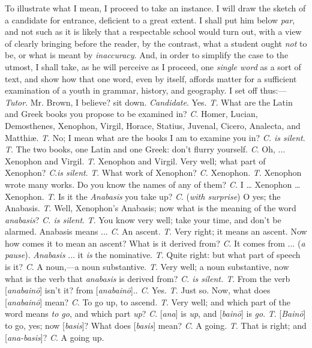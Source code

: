 To illustrate what I mean, I proceed to take an instance. I will
draw the sketch of a candidate for entrance, deficient to a great
extent. I shall put him below \emph{par}, and not such as it is likely that a
respectable school would turn out, with a view of clearly bringing
before the reader, by the contrast, what a student ought \emph{not} to
be, or what is meant by \emph{inaccuracy}. And, in order to simplify
the case to the utmost, I shall take, as he will perceive as I
proceed, one \emph{single word} as a sort of text, and show how that
one word, even by itself, affords matter for a sufficient examination
of a youth in grammar, history, and geography. I set off thus:—
\emph{Tutor}. Mr. Brown, I believe? sit down. \emph{Candidate}. Yes.
\emph{T.} What are the Latin and Greek books you propose to be
examined in? \emph{C}. Homer, Lucian, Demosthenes, Xenophon, Virgil,
Horace, Statius, Juvenal, Cicero, Analecta, and Matthiæ.
\emph{T}. No; I mean what are the books I am to examine you in? \emph{C.
is silent}.
\emph{T}. The two books, one Latin and one Greek: don't flurry
yourself. \emph{C}. Oh, ... Xenophon and Virgil.
\emph{T}. Xenophon and Virgil. Very well; what part of Xenophon? \emph{C}.\emph{is silent}.
\emph{T}. What work of Xenophon? \emph{C.} Xenophon.
\emph{T}. Xenophon wrote many works. Do you know the names of
any of them? \emph{C.} I … Xenophon … Xenophon.
\emph{T}. Is it the \emph{Anabasis} you take up? \emph{C}. (\emph{with
surprise}) O yes; the Anabasis.
\emph{T}. Well, Xenophon's Anabasis; now what is the meaning of the
word \emph{anabasis}? \emph{C. is silent}.
\emph{T}. You know very well; take your time, and don't be alarmed.
Anabasis means ... \emph{C}. An ascent.
\emph{T}. Very right; it means an ascent. Now how comes it to mean an
ascent? What is it derived from? \emph{C}. It comes from ... (\emph{a
pause}). \emph{Anabasis} ... it \emph{is} the nominative.
\emph{T}. Quite right: but what part of speech is it? \emph{C}. A
noun,—a noun substantive.
\emph{T}. Very well; a noun substantive, now what is the verb that \emph{anabasis}
is derived from? \emph{C. is silent. T}. From the verb [\emph{anabain\={o}}]
isn't it? from [\emph{anabain\={o}}]..
\emph{C}. Yes.
\emph{T}. Just so. Now, what does [\emph{anabain\={o}}]
mean? \emph{C}. To go up, to ascend.
\emph{T}. Very well; and which part of the word means \emph{to go}, and which
part \emph{up}? \emph{C}. [\emph{ana}] is \emph{up}, and [\emph{bain\={o}}]
is \emph{go}.
\emph{T}. [\emph{Bain\={o}}] to
go, yes; now [\emph{basis}]? What does [\emph{basis}] mean? \emph{C}.
A going.
\emph{T}. That is right; and [\emph{ana-basis}]? \emph{C}. A going up.
